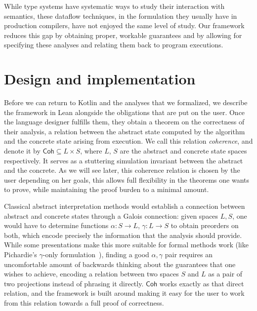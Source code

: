 \documentclass[runningheads]{llncs}
\newcommand{\coh}{\mathsf{Coh}}
\begin{document}
While type systems have systematic ways to study their interaction with semantics, these dataflow techniques, in the formulation they usually have in production compilers, have not enjoyed the same level of study. Our framework reduces this gap by obtaining proper, workable guarantees and by allowing for specifying these analyses and relating them back to program executions.


\section{Design and implementation}
\label{sec:design}

Before we can return to Kotlin and the analyses that we formalized, we describe the framework in Lean alongside the obligations that are put on the user. Once the language designer fulfills them, they obtain a theorem on the correctness of their analysis, a relation between the abstract state computed by the algorithm and the concrete state arising from execution. We call this relation \emph{coherence}, and denote it by $\coh \subseteq L \times S$, where $L$, $S$ are the abstract and concrete state spaces respectively. It serves as a stuttering simulation invariant between the abstract and the concrete. As we will see later, this coherence relation is chosen by the user depending on her goals, this allows full flexibility in the theorems one wants to prove, while maintaining the proof burden to a minimal amount.

Classical abstract interpretation methods would establish a connection between abstract and concrete states through a Galois connection: given spaces $L, S$, one would have to determine functions $\alpha : S \to L$, $\gamma : L \to S$ to obtain preorders on both, which encode precisely the information that the analysis should provide. While some presentations make this more suitable for formal methods work (like Pichardie's $\gamma$-only formulation~\cite{picha2005}), finding a good $\alpha, \gamma$ pair requires an uncomfortable amount of backwards thinking about the guarantees that one wishes to achieve, encoding a relation between two spaces $S$ and $L$ as a pair of two projections instead of phrasing it directly. $\coh$ works exactly as that direct relation, and the framework is built around making it easy for the user to work from this relation towards a full proof of correctness.
\end{document}
